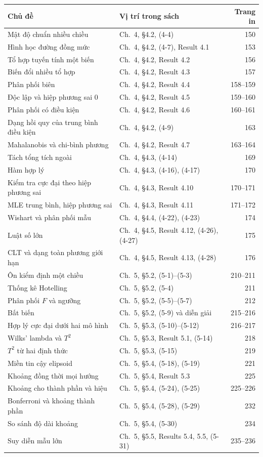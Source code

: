 \footnotesize
\begin{longtable}{L{.35\linewidth}L{.43\linewidth}r}
\toprule
Chủ đề & Vị trí trong sách & Trang in\\
\midrule
\endhead
Mật độ chuẩn nhiều chiều & Ch.~4, §4.2, (4-4) & 150\\
Hình học đường đồng mức & Ch.~4, §4.2, (4-7), Result 4.1 & 153\\
Tổ hợp tuyến tính một biến & Ch.~4, §4.2, Result 4.2 & 156\\
Biến đổi nhiều tổ hợp & Ch.~4, §4.2, Result 4.3 & 157\\
Phân phối biên & Ch.~4, §4.2, Result 4.4 & 158--159\\
Độc lập và hiệp phương sai 0 & Ch.~4, §4.2, Result 4.5 & 159--160\\
Phân phối có điều kiện & Ch.~4, §4.2, Result 4.6 & 160--161\\
Dạng hồi quy của trung bình điều kiện & Ch.~4, §4.2, (4-9) & 163\\
Mahalanobis và chi-bình phương & Ch.~4, §4.2, Result 4.7 & 163--164\\
Tách tổng tích ngoài & Ch.~4, §4.3, (4-14) & 169\\
Hàm hợp lý & Ch.~4, §4.3, (4-16), (4-17) & 170\\
Kiểm tra cực đại theo hiệp phương sai & Ch.~4, §4.3, Result 4.10 & 170--171\\
MLE trung bình, hiệp phương sai & Ch.~4, §4.3, Result 4.11 & 171--172\\
Wishart và phân phối mẫu & Ch.~4, §4.4, (4-22), (4-23) & 174\\
Luật số lớn & Ch.~4, §4.5, Result 4.12, (4-26), (4-27) & 175\\
CLT và dạng toàn phương giới hạn & Ch.~4, §4.5, Result 4.13, (4-28) & 176\\
Ôn kiểm định một chiều & Ch.~5, §5.2, (5-1)--(5-3) & 210--211\\
Thống kê Hotelling & Ch.~5, §5.2, (5-4) & 211\\
Phân phối $F$ và ngưỡng & Ch.~5, §5.2, (5-5)--(5-7) & 212\\
Bất biến & Ch.~5, §5.2, (5-9) và diễn giải & 215--216\\
Hợp lý cực đại dưới hai mô hình & Ch.~5, §5.3, (5-10)--(5-12) & 216--217\\
Wilks' lambda và $T^2$ & Ch.~5, §5.3, Result 5.1, (5-14) & 218\\
$T^2$ từ hai định thức & Ch.~5, §5.3, (5-15) & 219\\
Miền tin cậy elipsoid & Ch.~5, §5.4, (5-18), (5-19) & 221\\
Khoảng đồng thời mọi hướng & Ch.~5, §5.4, Result 5.3 & 225\\
Khoảng cho thành phần và hiệu & Ch.~5, §5.4, (5-24), (5-25) & 225--226\\
Bonferroni và khoảng thành phần & Ch.~5, §5.4, (5-28), (5-29) & 232\\
So sánh độ dài khoảng & Ch.~5, §5.4, (5-30) & 234\\
Suy diễn mẫu lớn & Ch.~5, §5.5, Results 5.4, 5.5, (5-31) & 235--236\\
\bottomrule
\end{longtable}
\normalsize

